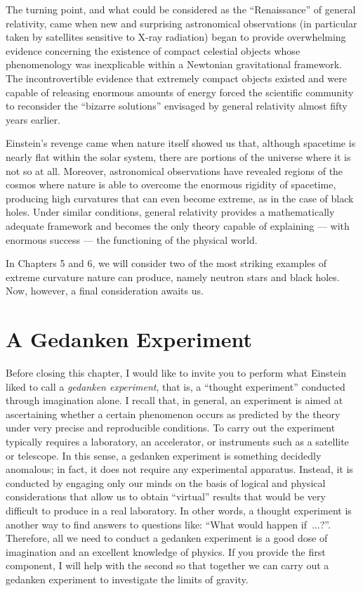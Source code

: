 The turning point, and what could be considered as the ``Renaissance'' of general
relativity, came when new and surprising astronomical observations
(in particular taken by satellites sensitive to X-ray radiation)
 began to provide overwhelming evidence concerning the existence of
compact celestial objects whose phenomenology was inexplicable within a Newtonian
gravitational framework. The incontrovertible evidence that extremely compact objects
existed and were capable of releasing enormous amounts of energy forced the scientific
community to reconsider the ``bizarre solutions'' envisaged by general relativity almost
fifty years earlier.

Einstein's revenge came when nature itself showed us that, although spacetime is nearly
flat within the solar system, there are portions of the universe where it is not so at
all. Moreover, astronomical observations have revealed regions of the cosmos where
nature is able to overcome the enormous rigidity of spacetime, producing high curvatures
that can even become extreme, as in the case of black holes. Under similar conditions,
general relativity provides a mathematically adequate framework and becomes the only
theory capable of explaining --- with enormous success --- the functioning of the
physical world.

In Chapters 5 and 6, we will consider two of the most striking examples of extreme
curvature nature can produce, namely neutron stars and black holes. Now, however, a
final consideration awaits us.

\section{A Gedanken Experiment}\label{sec:04-experiment}

Before closing this chapter, I would like to invite you to perform what Einstein liked
to call a \emph{gedanken experiment}, that is, a ``thought experiment'' conducted
through imagination alone. I recall that, in general, an experiment is aimed at
ascertaining whether a certain phenomenon occurs as predicted by the theory under very
precise and reproducible conditions. To carry out the experiment typically requires a
laboratory, an accelerator, or instruments such as a satellite or telescope. In this
sense, a gedanken experiment is something decidedly anomalous; in fact, it does not
require any experimental apparatus. Instead, it is conducted by engaging only our minds
on the basis of logical and physical considerations that allow us to obtain ``virtual''
results that would be very difficult to produce in a real laboratory. In other words, a
thought experiment is another way to find answers to questions like: ``What would happen
if~...?''. Therefore, all we need to conduct a gedanken experiment is a good dose of
imagination and an excellent knowledge of physics. If you provide the first component, I
will help with the second so that together we can carry out a gedanken experiment to
investigate the limits of gravity.

